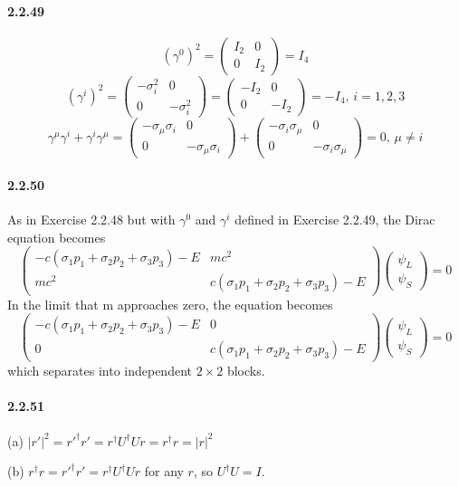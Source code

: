 \documentclass[a4paper]{article}
\begin{document}
\paragraph{2.2.49}
\[(\gamma^0)^2=
\begin{pmatrix}
I_2&0\\0&I_2
\end{pmatrix}=I_4
\]
\[
(\gamma^i)^2=
\begin{pmatrix}
-\sigma_i^2&0\\0&-\sigma_i^2
\end{pmatrix}=
\begin{pmatrix}
-I_2&0\\0&-I_2
\end{pmatrix}=-I_4 ,\, i=1,2,3
\]
\[
\gamma^\mu\gamma^i+\gamma^i\gamma^\mu=
\begin{pmatrix}
-\sigma_\mu\sigma_i&0\\
0&-\sigma_\mu\sigma_i
\end{pmatrix}+
\begin{pmatrix}
-\sigma_i\sigma_\mu&0\\
0&-\sigma_i\sigma_\mu
\end{pmatrix}=
0,\,\mu\neq i
\]

\paragraph{2.2.50}
As in Exercise 2.2.48 but with $\gamma^0$ and $\gamma^i$ defined in Exercise 2.2.49, the Dirac equation becomes
\[
\begin{pmatrix}
-c(\sigma_1p_1+\sigma_2p_2+\sigma_3p_3)-E&mc^2\\
mc^2&c(\sigma_1p_1+\sigma_2p_2+\sigma_3p_3)-E
\end{pmatrix}
\begin{pmatrix}
\psi_L\\\psi_S
\end{pmatrix}=0
\]
In the limit that m approaches zero, the equation becomes
\[
\begin{pmatrix}
-c(\sigma_1p_1+\sigma_2p_2+\sigma_3p_3)-E&0\\
0&c(\sigma_1p_1+\sigma_2p_2+\sigma_3p_3)-E
\end{pmatrix}
\begin{pmatrix}
\psi_L\\\psi_S
\end{pmatrix}=0
\]
which separates into independent $2\times2$ blocks.

\paragraph{2.2.51}
(a) $|r'|^2=r'^\dagger r'=r^\dagger U^\dagger Ur=r^\dagger r=|r|^2$

(b) $r^\dagger r=r'^\dagger r'=r^\dagger U^\dagger Ur$ for any $r$, so $U^\dagger U=I$.
\end{document}

